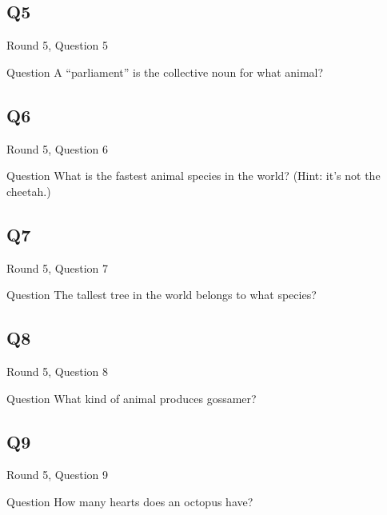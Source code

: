 \documentclass[11pt]{beamer}
\begin{document}
\subsection*{Q5}
\begin{frame}[t]{Round 5, Question 5}
\vspace{0.5em}
\begin{block}{Question}
A ``parliament'' is the collective noun for what animal?
\end{block}
\end{frame}
    

\subsection*{Q6}
\begin{frame}[t]{Round 5, Question 6}
\vspace{0.5em}
\begin{block}{Question}
What is the fastest animal species in the world? (Hint: it's not the cheetah.)
\end{block}
\end{frame}
    

\subsection*{Q7}
\begin{frame}[t]{Round 5, Question 7}
\vspace{0.5em}
\begin{block}{Question}
The tallest tree in the world belongs to what species?
\end{block}
\end{frame}
    

\subsection*{Q8}
\begin{frame}[t]{Round 5, Question 8}
\vspace{0.5em}
\begin{block}{Question}
What kind of animal produces gossamer?
\end{block}
\end{frame}
    

\subsection*{Q9}
\begin{frame}[t]{Round 5, Question 9}
\vspace{0.5em}
\begin{block}{Question}
How many hearts does an octopus have?
\end{block}
\end{frame}
    
\end{document}
